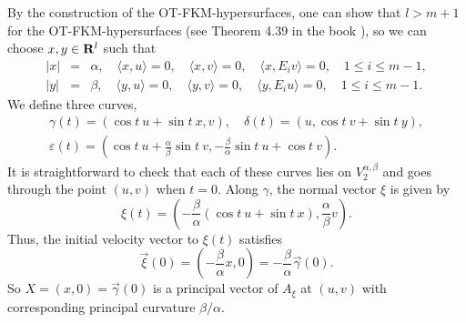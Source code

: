 \documentclass[12pt]{article}
\begin{document}
By the construction of the OT-FKM-hypersurfaces, one can show that $l > m+1$ for the OT-FKM-hypersurfaces (see
Theorem 4.39 in the book \cite[pp. 105--106]{Cec1}), so we can choose $x,y \in {\bf R}^l$
such that
\begin{eqnarray}
\label{eq:3.7.6}
|x| & = & \alpha, \quad \langle x, u \rangle = 0, \quad \langle x, v \rangle = 0, \quad \langle x, E_i v \rangle = 0, \quad 1 \leq i \leq m-1, \nonumber \\
|y| & = & \beta, \quad \langle y, u \rangle = 0, \quad \langle y, v \rangle = 0, \quad \langle y, E_i u\rangle = 0, \quad 1 \leq i \leq m-1. \nonumber 
\end{eqnarray}
We define three curves,
\begin{eqnarray}
\label{eq:3.7.7}
\gamma (t) = (\cos t \ u + \sin t \ x, v), \quad \delta (t) = (u, \cos t \ v + \sin t \ y),\\
\varepsilon (t) = (\cos t \ u + \frac{\alpha}{\beta} \sin t \ v, - \frac{\beta}{\alpha} \sin t \ u + \cos t \ v ).\nonumber 
\end{eqnarray}
It is straightforward to check that each of these curves lies on $V^{\alpha,\beta}_2$ and goes through the point
$(u,v)$ when $t=0$.  Along $\gamma$, the normal vector $\xi$ is given by
\begin{displaymath}
\xi(t) = \left( - \frac{\beta}{\alpha} (\cos t \ u + \sin t \ x), \frac{\alpha}{\beta} v \right).
\end{displaymath}
Thus, the initial velocity vector to $\xi(t)$ satisfies
\begin{displaymath}
\overrightarrow{\xi} (0) = \left( - \frac{\beta}{\alpha} x, 0 \right) = - \frac{\beta}{\alpha} \overrightarrow{\gamma} (0).
\end{displaymath}
So $X = (x,0) = \overrightarrow{\gamma} (0)$ is a principal vector of $A_\xi$ at $(u,v)$ with corresponding principal curvature 
$\beta / \alpha$.
\end{document}
